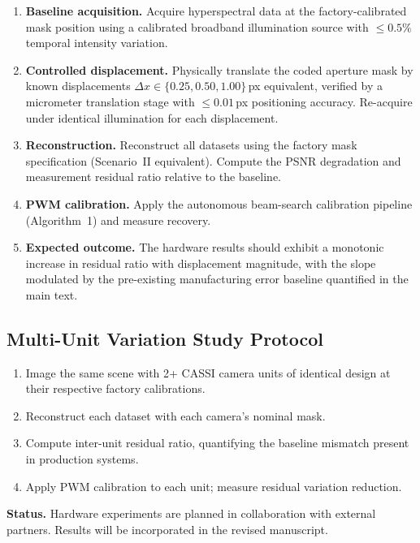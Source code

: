 \documentclass[11pt]{article}
\theoremstyle{definition}
\begin{document}
\begin{enumerate}
  \item \textbf{Baseline acquisition.}  Acquire hyperspectral data at the
    factory-calibrated mask position using a calibrated broadband illumination
    source with $\leq 0.5\%$ temporal intensity variation.
  \item \textbf{Controlled displacement.}  Physically translate the coded
    aperture mask by known displacements $\Delta x \in \{0.25, 0.50, 1.00\}$\,px
    equivalent, verified by a micrometer translation stage with $\leq 0.01$\,px
    positioning accuracy.  Re-acquire under identical illumination for each
    displacement.
  \item \textbf{Reconstruction.}  Reconstruct all datasets using the factory
    mask specification (Scenario~II equivalent).  Compute the PSNR degradation
    and measurement residual ratio relative to the baseline.
  \item \textbf{PWM calibration.}  Apply the autonomous beam-search calibration
    pipeline (Algorithm~1) and measure recovery.
  \item \textbf{Expected outcome.}  The hardware results should exhibit a
    monotonic increase in residual ratio with displacement magnitude,
    with the slope modulated by the pre-existing manufacturing error
    baseline quantified in the main text.
\end{enumerate}

\subsection{Multi-Unit Variation Study Protocol}

\begin{enumerate}
  \item Image the same scene with 2+ CASSI camera units of identical design
    at their respective factory calibrations.
  \item Reconstruct each dataset with each camera's nominal mask.
  \item Compute inter-unit residual ratio, quantifying the baseline mismatch
    present in production systems.
  \item Apply PWM calibration to each unit; measure residual variation reduction.
\end{enumerate}

\noindent\textbf{Status.}  Hardware experiments are planned in collaboration
with external partners.  Results will be incorporated in the revised manuscript.
\end{document}
